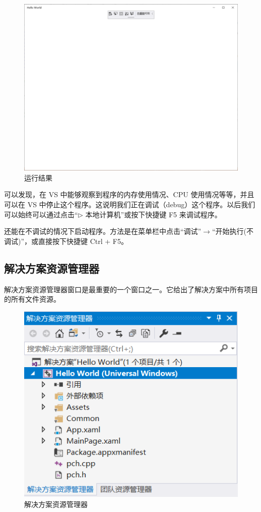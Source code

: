 \begin{figure}[htbp]
    \centering
    \includegraphics[width = 0.75\paperwidth]{pic/8.png}
    \caption{运行结果}
\end{figure}

可以发现，在 VS 中能够观察到程序的内存使用情况、CPU 使用情况等等，并且可以在 VS 中停止这个程序。这说明我们正在调试（debug）这个程序。以后我们可以始终可以通过点击``{\Large$\triangleright$} 本地计算机''或按下快捷键 F5 来调试程序。

还能在不调试的情况下启动程序。方法是在菜单栏中点击``调试''$\rightarrow$``开始执行(不调试)''，或直接按下快捷键 Ctrl + F5。

\subsection{解决方案资源管理器}

解决方案资源管理器窗口是最重要的一个窗口之一。它给出了解决方案中所有项目的所有文件资源。
\begin{figure}[htbp]
    \centering
    \includegraphics[width = 0.5\paperwidth]{pic/9.png}
    \caption{解决方案资源管理器}
\end{figure}

